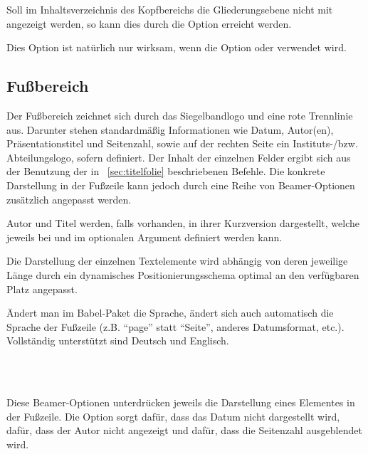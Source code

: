 Soll im Inhaltsverzeichnis des Kopfbereichs die Gliederungsebene
 nicht mit angezeigt werden, so kann dies durch die Option
 erreicht werden.

Dies Option ist natürlich nur wirksam, wenn die Option
 oder  verwendet wird.



\subsection{Fußbereich}\label{subsec:foot}

Der Fußbereich zeichnet sich durch das Siegelbandlogo und eine rote Trennlinie
aus. Darunter stehen standardmäßig Informationen wie Datum, Autor(en), Präsentationstitel
und Seitenzahl, sowie auf der rechten Seite ein Instituts-/bzw. Abteilungslogo,
sofern definiert.
Der Inhalt der einzelnen Felder ergibt sich aus der Benutzung der in
\chaptername~\ref{sec:titelfolie} beschriebenen Befehle.
Die konkrete Darstellung in der Fußzeile kann jedoch durch eine Reihe von
Beamer-Optionen zusätzlich angepasst werden.

Autor und Titel werden, falls vorhanden, in ihrer Kurzversion dargestellt,
welche jeweils bei  und  im optionalen Argument
definiert werden kann.

Die Darstellung der einzelnen Textelemente wird abhängig von deren
jeweilige Länge durch ein dynamisches Positionierungsschema optimal
an den verfügbaren Platz angepasst.

Ändert man im Babel-Paket die Sprache, ändert sich auch automatisch
die Sprache der Fußzeile (z.B. "`page"' statt "`Seite"', anderes Datumsformat, etc.).
Vollständig unterstützt sind Deutsch und Englisch.

\begin{Declaration}
  \\
  \\
\end{Declaration}

Diese Beamer-Optionen unterdrücken jeweils die Darstellung eines Elementes in der Fußzeile.
Die Option  sorgt dafür, dass das Datum nicht dargestellt wird,
 dafür, dass der Autor nicht angezeigt und
 dafür, dass die Seitenzahl ausgeblendet wird.

